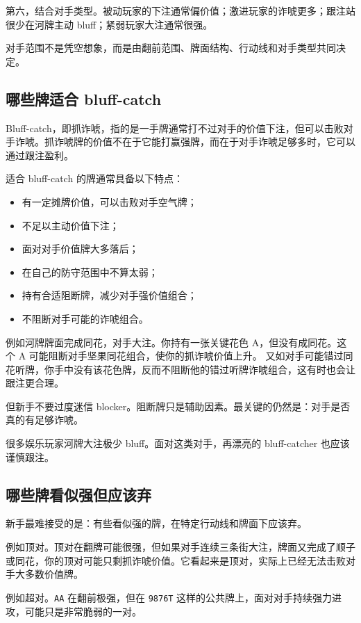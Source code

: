 第六，结合对手类型。被动玩家的下注通常偏价值；激进玩家的诈唬更多；跟注站很少在河牌主动 bluff；紧弱玩家大注通常很强。

对手范围不是凭空想象，而是由翻前范围、牌面结构、行动线和对手类型共同决定。

\subsection{哪些牌适合 bluff-catch}

Bluff-catch，即抓诈唬，指的是一手牌通常打不过对手的价值下注，但可以击败对手诈唬。抓诈唬牌的价值不在于它能打赢强牌，而在于对手诈唬足够多时，它可以通过跟注盈利。

适合 bluff-catch 的牌通常具备以下特点：

\begin{itemize}
\item 有一定摊牌价值，可以击败对手空气牌；
\item 不足以主动价值下注；
\item 面对对手价值牌大多落后；
\item 在自己的防守范围中不算太弱；
\item 持有合适阻断牌，减少对手强价值组合；
\item 不阻断对手可能的诈唬组合。
\end{itemize}

例如河牌牌面完成同花，对手大注。你持有一张关键花色 A，但没有成同花。这个 A 可能阻断对手坚果同花组合，使你的抓诈唬价值上升。
又如对手可能错过同花听牌，你手中没有该花色牌，反而不阻断他的错过听牌诈唬组合，这有时也会让跟注更合理。

但新手不要过度迷信 blocker。阻断牌只是辅助因素。最关键的仍然是：对手是否真的有足够诈唬。

很多娱乐玩家河牌大注极少 bluff。面对这类对手，再漂亮的 bluff-catcher 也应该谨慎跟注。

\subsection{哪些牌看似强但应该弃}

新手最难接受的是：有些看似强的牌，在特定行动线和牌面下应该弃。

例如顶对。顶对在翻牌可能很强，但如果对手连续三条街大注，牌面又完成了顺子或同花，你的顶对可能只剩抓诈唬价值。它看起来是顶对，实际上已经无法击败对手大多数价值牌。

例如超对。\texttt{AA} 在翻前极强，但在 \texttt{9876T} 这样的公共牌上，面对对手持续强力进攻，可能只是非常脆弱的一对。

